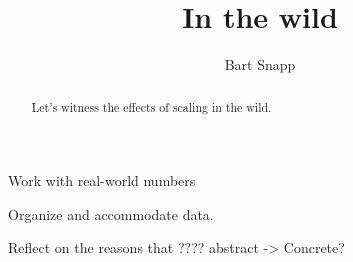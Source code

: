 \documentclass[nooutcomes,noauthor]{ximera}
\title{In the wild}
\author{Bart Snapp}
\begin{document}
\begin{abstract}
  Let's witness the effects of scaling in the wild.
\end{abstract}
\maketitle


\begin{listOutcomes}
\item Work with real-world numbers
\item Organize and accommodate data.
\item Reflect on the reasons that ???? abstract -> Concrete?

\end{listOutcomes}





\mynewpage
\end{document}

